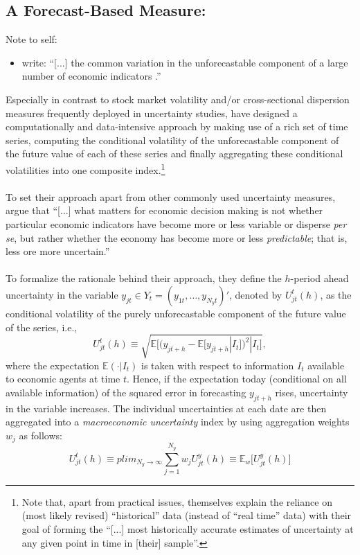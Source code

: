 \documentclass[a4paper,11pt,listof=nochaptergap,oneside,pointednumbers,bibtotoc,bigheadings,liststotoc]{scrbook}
\theoremstyle{mysatz}
\theoremstyle{mydefinition}
\theoremstyle{mybemerkung}
\begin{document}
\subsection{A Forecast-Based Measure: \citet{juradoetal:15}}
\label{sec:macrouncertainty}
\begingroup
    \fontsize{8pt}{12pt}\selectfont
    Note to self:
\begin{itemize}
	\item  \citet[p. 1]{gilchristetal:14} write: ``[...] the common variation in the unforecastable component of a large number of economic indicators \citep{juradoetal:15}.''
\end{itemize}
\endgroup

Especially in contrast to stock market volatility and/or cross-sectional dispersion measures frequently deployed in uncertainty studies, \citet{juradoetal:15} have designed a computationally and data-intensive approach by making use of a rich set of time series, computing the conditional volatility of the unforecastable component of the future value of each of these series and finally aggregating these conditional volatilities into one composite index.\footnote{Note that, apart from practical issues, \citet[p. 1191]{juradoetal:15} themselves explain the reliance on (most likely revised) ``historical'' data (instead of ``real time'' data) with their goal of forming the ``[...] most historically accurate estimates of uncertainty at any given point in time in [their] sample''.}\\
\\
To set their approach apart from other commonly used uncertainty measures, \citet[p. 1178]{juradoetal:15} argue that ``[...] what matters for economic decision making is not whether particular economic indicators have become more or less variable or disperse \textit{per se}, but rather whether the economy has become more or less \textit{predictable}; that is, less ore more uncertain.''\\
\\
To formalize the rationale behind their approach, they define the $h$-period ahead uncertainty in the variable $y_{jt} \in Y_t = (y_{1t}, \ldots, y_{N_{y}t})'$, denoted by $U^t_{jt}(h)$, as the conditional volatility of the purely unforecastable component of the future value of the series, i.e.,
\begin{equation} \label{eq:juradoetal_1}
U^t_{jt}(h) \equiv \sqrt{\mathbb{E}\Big[(y_{jt+h} - \mathbb{E}[y_{jt+h}|I_t])^2|I_t\Big]},
\end{equation}
where the expectation $\mathbb{E}(\cdot|I_t)$ is taken with respect to information $I_t$ available to economic agents at time $t$. Hence, if the expectation today (conditional on all available information) of the squared error in forecasting $y_{jt+h}$ rises, uncertainty in the variable increases. The individual uncertainties at each date are then aggregated into a \textit{macroeconomic uncertainty} index by using aggregation weights $w_j$ as follows:
\begin{equation} \label{eq:juradoetal_2}
U^t_{jt}(h) \equiv plim_{N_{y}\to\infty} \sum_{j=1}^{N_y} w_j U_{jt}^y(h) \equiv \mathbb{E}_w \Big[U_{jt}^y(h)\Big]
\end{equation}
\end{document}

